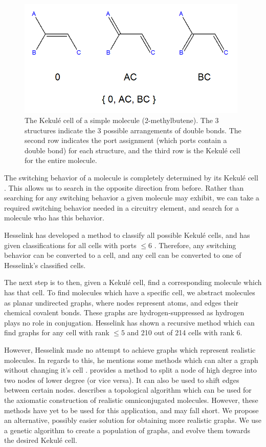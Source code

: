 \documentclass[12pt]{article}
\begin{document}
\begin{figure}[ht!]
\centering
\includegraphics[width=110mm]{KekuleCell.png}
\caption{The Kekul\'e cell of a simple molecule (2-methylbutene). The 3 structures indicate the 3 possible arrangements of double bonds. The second row indicates the port assignment (which ports contain a double bond) for each structure, and the third row is the Kekul\'e cell for the entire molecule. }
\label{fig:kekuleCell}
\end{figure}

The switching behavior of a molecule is completely determined by its Kekul\'e cell \cite{H13, HH13}. This allows us to search in the opposite direction from before. Rather than searching for any switching behavior a given molecule may exhibit, we can take a required switching behavior needed in a circuitry element, and search for a molecule who has this behavior.

Hesselink \cite{H13} has developed a method to classify all possible Kekul\'e cells, and has given classifications for all cells with ports $\le 6$ . Therefore, any switching behavior can be converted to a cell, and any cell can be converted to one of Hesselink's \cite{H13} classified cells.

The next step is to then, given a Kekul\'e cell, find a corresponding molecule which has that cell. To find molecules which have a specific cell, we abstract molecules as planar undirected graphs, where nodes represent atoms, and edges their chemical covalent bonds. These graphs are hydrogen-suppressed as hydrogen plays no role in conjugation. Hesselink \cite{H13} has shown a recursive method which can find graphs for any cell with rank $\le 5$ and 210 out of 214 cells with rank 6. 

However, Hesselink made no attempt to achieve graphs which represent realistic molecules. In regards to this, he mentions some methods which can alter a graph without changing it's cell \cite{HH13, v06}. \cite{HH13} provides a method to split a node of high degree into two nodes of lower degree (or vice versa). It can also be used to shift edges between certain nodes. \cite{v06} describes a topological algorithm which can be used for the axiomatic construction of realistic omniconjugated molecules. However, these methods have yet to be used for this application, and may fall short. We propose an alternative, possibly easier solution for obtaining more realistic graphs. We use a genetic algorithm to create a population of graphs, and evolve them towards the desired Kekul\'e cell.
\end{document}
